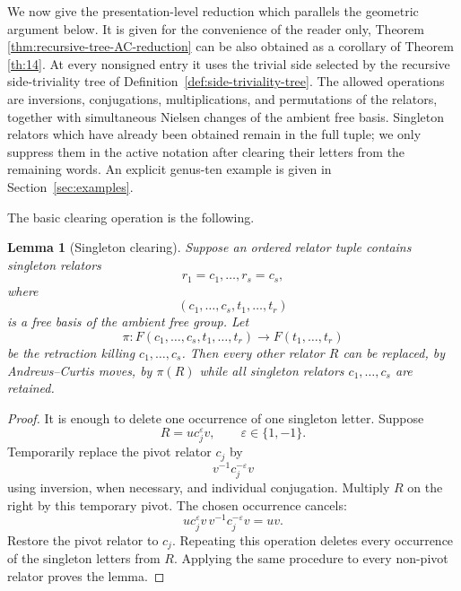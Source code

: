 \documentclass{article}
\newtheorem{lm}[theorem]{Lemma}
\begin{document}
We now give the presentation-level reduction which parallels the geometric
argument below.  It is given for the convenience of the reader only, Theorem \ref{thm:recursive-tree-AC-reduction}  can be also obtained as a corollary of Theorem \ref{th:14}. At every nonsigned
entry it uses the trivial side selected by the recursive side-triviality
tree of Definition~\ref{def:side-triviality-tree}.  
The allowed operations are inversions, conjugations, multiplications, and
permutations of the relators, together with simultaneous Nielsen changes of
the ambient free basis.    Singleton
relators which have already been obtained remain in the full tuple; we only
suppress them in the active notation after clearing their letters from the
remaining words. An explicit genus-ten example is given in Section~\ref{sec:examples}.

The basic clearing operation is the following.

\begin{lm}[Singleton clearing]
\label{lem:singleton-clearing}
Suppose an ordered relator tuple contains singleton relators
\[
 r_1=c_1,\ldots,r_s=c_s,
\]
where
\[
 (c_1,\ldots,c_s,t_1,\ldots,t_r)
\]
is a free basis of the ambient free group.  Let
\[
 \pi:F(c_1,\ldots,c_s,t_1,\ldots,t_r)
 \longrightarrow F(t_1,\ldots,t_r)
\]
be the retraction killing $c_1,\ldots,c_s$.  Then every other relator $R$
can be replaced, by Andrews--Curtis moves, by $\pi(R)$ while all
singleton relators $c_1,\ldots,c_s$ are retained.
\end{lm}

\begin{proof}
It is enough to delete one occurrence of one singleton letter.  Suppose
\[
 R=uc_j^{\varepsilon}v,
 \qquad \varepsilon\in\{1,-1\}.
\]
Temporarily replace the pivot relator $c_j$ by
\[
 v^{-1}c_j^{-\varepsilon}v
\]
using inversion, when necessary, and individual conjugation.  Multiply $R$
on the right by this temporary pivot.  The chosen occurrence cancels:
\[
 uc_j^{\varepsilon}v\,v^{-1}c_j^{-\varepsilon}v=uv.
\]
Restore the pivot relator to $c_j$.  Repeating this operation deletes every
occurrence of the singleton letters from $R$.  Applying the same procedure
to every non-pivot relator proves the lemma.
\end{proof}
\end{document}
